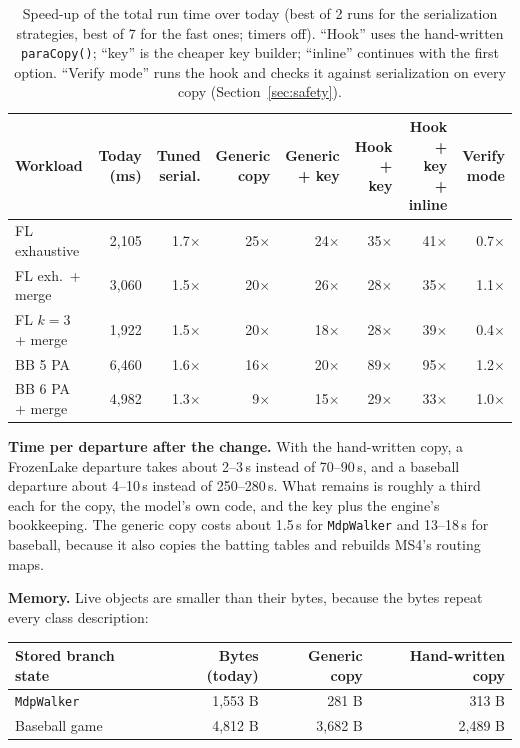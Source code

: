 \documentclass[11pt]{article}
\newcommand{\code}[1]{\texttt{#1}}
\newcommand{\us}{\,\textmu s}
\begin{document}
\begin{table}[h]
\centering\small
\begin{tabularx}{\linewidth}{@{}l*{7}{R}@{}}
\toprule
\textbf{Workload} & \textbf{Today (ms)} & \textbf{Tuned serial.} & \textbf{Generic copy} & \textbf{Generic + key} &
  \textbf{Hook + key} & \textbf{Hook + key + inline} & \textbf{Verify mode}\\
\midrule
FL exhaustive       & 2{,}105 & 1.7$\times$ & 25$\times$ & 24$\times$ & 35$\times$ & 41$\times$ & 0.7$\times$\\
FL exh.\ + merge    & 3{,}060 & 1.5$\times$ & 20$\times$ & 26$\times$ & 28$\times$ & 35$\times$ & 1.1$\times$\\
FL $k{=}3$ + merge  & 1{,}922 & 1.5$\times$ & 20$\times$ & 18$\times$ & 28$\times$ & 39$\times$ & 0.4$\times$\\
BB 5 PA             & 6{,}460 & 1.6$\times$ & 16$\times$ & 20$\times$ & 89$\times$ & 95$\times$ & 1.2$\times$\\
BB 6 PA + merge     & 4{,}982 & 1.3$\times$ & 9$\times$  & 15$\times$ & 29$\times$ & 33$\times$ & 1.0$\times$\\
\bottomrule
\end{tabularx}
\caption{Speed-up of the total run time over today (best of 2 runs for the serialization strategies, best of 7 for
the fast ones; timers off). ``Hook'' uses the hand-written \code{paraCopy()}; ``key'' is the cheaper key builder;
``inline'' continues with the first option. ``Verify mode'' runs the hook and checks it against serialization on
every copy (Section~\ref{sec:safety}).}
\label{tab:speedup}
\end{table}

\textbf{Time per departure after the change.} With the hand-written copy, a FrozenLake departure takes about
2--3\us{} instead of 70--90\us{}, and a baseball departure about 4--10\us{} instead of 250--280\us. What remains is
roughly a third each for the copy, the model's own code, and the key plus the engine's bookkeeping. The generic copy
costs about 1.5\us{} for \code{MdpWalker} and 13--18\us{} for baseball, because it also copies the batting tables and
rebuilds MS4's routing maps.

\textbf{Memory.} Live objects are smaller than their bytes, because the bytes repeat every class description:
\begin{center}\small
\begin{tabularx}{0.85\linewidth}{@{}lRRR@{}}
\toprule
\textbf{Stored branch state} & \textbf{Bytes (today)} & \textbf{Generic copy} & \textbf{Hand-written copy}\\
\midrule
\code{MdpWalker}    & 1{,}553 B & 281 B & 313 B\\
Baseball game       & 4{,}812 B & 3{,}682 B & 2{,}489 B\\
\bottomrule
\end{tabularx}
\end{center}
\end{document}
